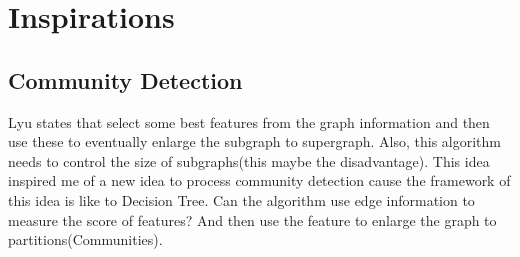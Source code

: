 \documentclass{article}
\begin{document}
	\section{Inspirations}
	\subsection{Community Detection}
	Lyu\cite{lyu2016scalable} states that select some best features from the graph information and then use these to eventually enlarge the subgraph to supergraph. 
	\newline
	Also, this algorithm needs to control the size of subgraphs(this maybe the disadvantage).
	\newline
	This idea inspired me of a new idea to process community detection cause the framework of this idea is like to Decision Tree. Can the algorithm use edge information to measure the score of features? And then use the feature to enlarge the graph to partitions(Communities).
\end{document}
